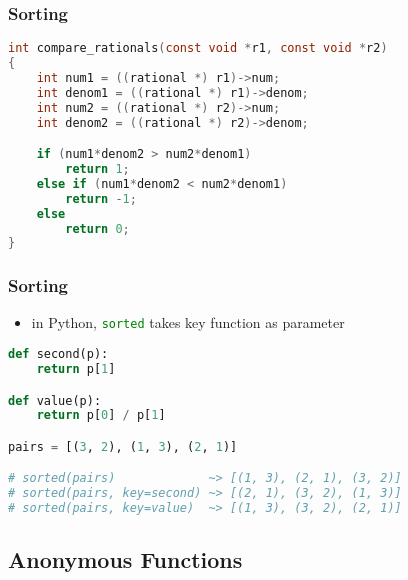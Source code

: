 \documentclass[dvipsnames]{beamer}
\theoremstyle{plain}
\begin{document}
\begin{frame}[fragile]
  \frametitle{Sorting}

  \begin{exampleblock}{}
    \begin{lstlisting}[language=C]
int compare_rationals(const void *r1, const void *r2)
{
    int num1 = ((rational *) r1)->num;
    int denom1 = ((rational *) r1)->denom;
    int num2 = ((rational *) r2)->num;
    int denom2 = ((rational *) r2)->denom;

    if (num1*denom2 > num2*denom1)
        return 1;
    else if (num1*denom2 < num2*denom1)
        return -1;
    else
        return 0;
}
    \end{lstlisting}
  \end{exampleblock}
\end{frame}

\begin{frame}[fragile]
  \frametitle{Sorting}

  \begin{exampleblock}{}
    \begin{itemize}
      \item in Python, \lstinline[language=Python]{sorted} takes key function
        as parameter
    \end{itemize}

    \begin{lstlisting}[language=Python]
def second(p):
    return p[1]

def value(p):
    return p[0] / p[1]

pairs = [(3, 2), (1, 3), (2, 1)]

# sorted(pairs)             ~> [(1, 3), (2, 1), (3, 2)]
# sorted(pairs, key=second) ~> [(2, 1), (3, 2), (1, 3)]
# sorted(pairs, key=value)  ~> [(1, 3), (3, 2), (2, 1)]
    \end{lstlisting}
  \end{exampleblock}
\end{frame}

\subsection{Anonymous Functions}
\end{document}
